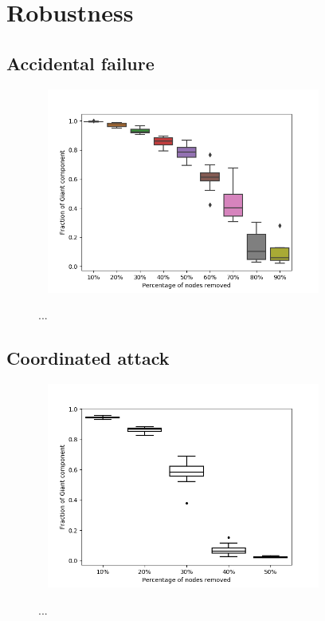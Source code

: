 \section{Robustness}

\subsection{Accidental failure}

\begin{figure}[!htb]
	\hspace*{-1cm}\ 
	\centering
	\includegraphics[width=9cm]{images/robustness_barabasi.png}
	\caption{ ...
	}
	\label{fig:allocee}
	\hspace*{2mm} 
\end{figure}

\subsection{Coordinated attack}

\begin{figure}[!htb]
	\hspace*{-1cm}\ 
	\centering
	\includegraphics[width=9cm]{images/robustness_coordinated.png}
	\caption{ ...
	}
	\label{fig:alloeeec}
	\hspace*{2mm}
\end{figure}


